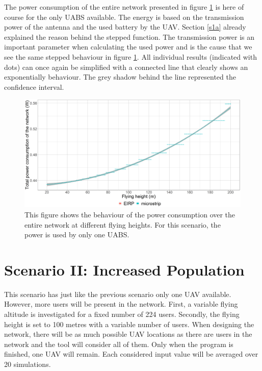 The power consumption of the entire network presented in figure \ref{fig:fhvspc} is here of course for the only \gls{UABS} available.
The energy is based on the transmission power of the antenna and the used battery by the \gls{UAV}.
Section \ref{s1a} already explained the reason behind the stepped function. The transmission power 
is an important parameter when calculating the used power and is the cause that we see the same stepped behaviour in 
figure \ref{fig:fhvspc}. All individual results (indicated with dots) can once again be simplified 
with a connected line that clearly shows an exponentially behaviour. The grey shadow 
behind the line represented the confidence interval.

\begin{figure}[t]
  \centering
  \includegraphics[width=\textwidth]{../results/s1/fhvspc.png}
  \caption{This figure shows the behaviour of the power consumption over the entire network at different flying  heights.
  For this scenario, the power is used by only one \acs{UABS}.}
  \label{fig:fhvspc}
\end{figure}
\FloatBarrier
\section{Scenario II: Increased Population}

This scenario has just like the previous scenario only one \gls{UAV} available. However, more users will be present in the network.
First, a variable flying altitude is investigated for a fixed number of 224 users. 
Secondly, the flying height is set to 100 metres with a variable number of users.
When designing the network, there will be as much possible \gls{UAV} locations as there are users in the network and the tool
will consider all of them. Only when the program is finished, one \gls{UAV} will remain.
Each considered input value will be averaged over 20 simulations.



